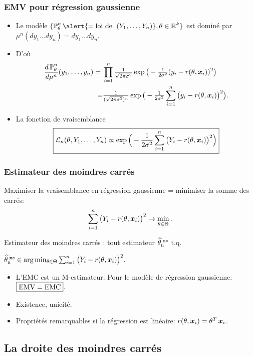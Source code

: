 \begin{frame}
\frametitle{EMV pour régression gaussienne}
\begin{itemize}
\item  Le modèle $\{\PP_\truetheta^n \alert{ = \text{loi de }\;(Y_1,\ldots, Y_n)},\truetheta \in \R^k\}$ est \alert{dominé} par
$\mu^n(dy_1\ldots dy_n) = dy_1\ldots dy_n.$
\item D'où
\begin{align*}
 \frac{d\operatorname{{\mathbb P}}_\theta^n}{d\mu^n}(y_1,\ldots, y_n)
  =\; &\prod_{i=1}^n \tfrac{1}{\sqrt{2\pi \sigma^2}}\exp
  \big(-\tfrac{1}{2\sigma^2}(y_i-r({\theta},\operatorname{\boldsymbol{x}}_i))^2\big) \\
\;= & \tfrac{1}{(\sqrt{2\pi \sigma^2})^{n}}
\exp\big(-\tfrac{1}{2\sigma^2}\sum_{i =
1}^n\big(y_i-r({\theta},\operatorname{\boldsymbol{x}}_i)\big)^2\big).
\end{align*}
\item La fonction de vraisemblance
$$\boxed{{\mathcal L}_n(\theta, Y_1,\ldots, Y_n)
\propto \exp\Big(-\frac{1}{2\sigma^2}\sum_{i = 1}^n\big(Y_i-
r({\theta},\operatorname{\boldsymbol{x}}_i)\big)^2\Big)}$$
\end{itemize}
\end{frame}

\begin{frame}
\frametitle{Estimateur des moindres carrés} Maximiser la
\alert{ vraisemblance} en régression gaussienne = minimiser
la somme des carrés: $$ \sum_{i = 1}^n
\big(Y_i-r({\theta},\operatorname{\boldsymbol{x}}_i)\big)^2 \to \min_{\theta \in\Theta}.
$$
\begin{df}
Estimateur des \alert{moindres carrés} : tout estimateur
$\operatorname{\widehat \theta_n^{\,\,{\tt mc}}}$ t.q. \centerline{$\operatorname{\widehat \theta_n^{\,\,{\tt mc}}} \in \arg \min_{\theta \in
\Theta}\sum_{i = 1}^n \big(Y_i-r({\theta},\operatorname{\boldsymbol{x}}_i)\big)^2.$}
\end{df}
\begin{itemize}
\item  L'EMC est un M-estimateur. Pour le
modèle de régression gaussienne: $\boxed{\rm EMV = EMC}$.
\item \alert{ Existence, unicité.}
\item Propriétés remarquables si la régression est linéaire:
$r({\theta},\operatorname{\boldsymbol{x}}_i) = \theta^T\operatorname{\boldsymbol{x}}_i$.
\end{itemize}
\end{frame}

\subsection{La droite des moindres carrés}

